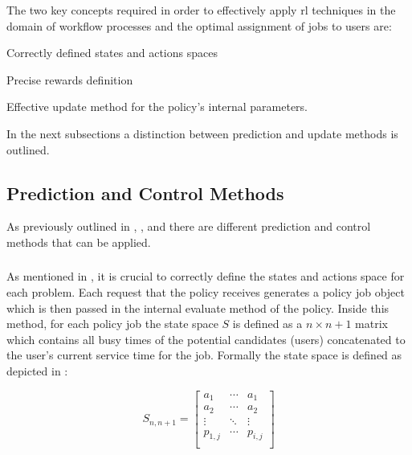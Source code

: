 The two key concepts required in order to effectively apply \gls{rl} techniques in the domain of workflow processes and the optimal assignment of jobs to users are:
\begin{enumerate*}
	\item Correctly defined states and actions spaces
	\item Precise rewards definition
	\item Effective update method for the policy's internal parameters. 
\end{enumerate*}

In the next subsections a distinction between prediction and update methods is outlined.

\subsection{Prediction and Control Methods}

As previously outlined in , ,  and  there are different prediction and control methods that can be applied.

\subsubsection{}

As mentioned in , it is crucial to correctly define the states and actions space for each problem. Each request that the policy receives generates a policy job object which is then passed in the internal evaluate method of the policy. Inside this method, for each policy job the state space $S$ is defined as a $n \times n+1$ matrix which contains all busy times of the potential candidates (\ie users) concatenated to the user's current service time for the job. Formally the state space is defined as depicted in :

\begin{equation}
\label{eq:kbatch_sp}
	S_{n,n+1} = 
	\begin{bmatrix}
	a_1 & \cdots & a_1 \\
	a_2 & \cdots & a_2 \\
	\vdots & \ddots & \vdots \\
	p_{1,j} & \cdots & p_{i,j} \\
	\end{bmatrix}
\end{equation}

